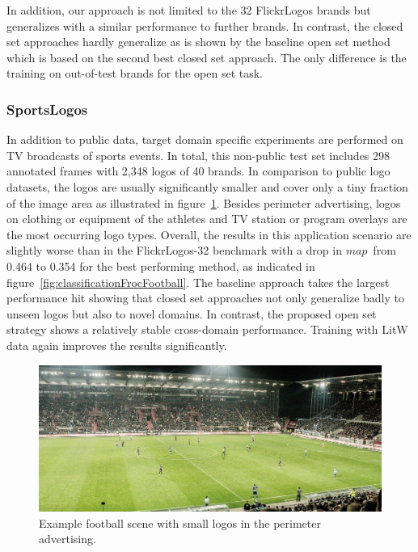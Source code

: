 \documentclass[a4paper,twoside]{article}
\newcommand{\map}{$\mathit{map}$}
\begin{document}
In addition, our approach is not limited to the 32 FlickrLogos brands but generalizes with a similar performance to further brands. In contrast, the closed set approaches hardly generalize as is shown by the baseline open set method which is based on the second best closed set approach. The only difference is the training on out-of-test brands for the open set task.

\subsubsection*{SportsLogos}
In addition to public data, target domain specific experiments are performed on TV broadcasts of sports events. In total, this non-public test set includes 298 annotated frames with 2,348 logos of 40 brands. In comparison to public logo datasets, the logos are usually significantly smaller and cover only a tiny fraction of the image area as illustrated in figure~\ref{fig:footballSample}. Besides perimeter advertising, logos on clothing or equipment of the athletes and TV station or program overlays are the most occurring logo types.
Overall, the results in this application scenario are slightly worse than in the FlickrLogos-32 benchmark with a drop in \map~from 0.464 to 0.354 for the best performing method, as indicated in figure~\ref{fig:classificationFrocFootball}. The baseline approach takes the largest performance hit showing that closed set approaches not only generalize badly to unseen logos but also to novel domains. In contrast, the proposed open set strategy shows a relatively stable cross-domain performance. Training with \ac{LitW} data again improves the results significantly.
%
\begin{figure}%
\centering%
\includegraphics[width=\linewidth, trim=0cm 0cm 0cm 0.5cm, clip]{img/football-1908719_1920_cut.jpg}%
\caption{Example football scene with small logos in the perimeter advertising.}%
\label{fig:footballSample}
\end{figure}%
\end{document}
